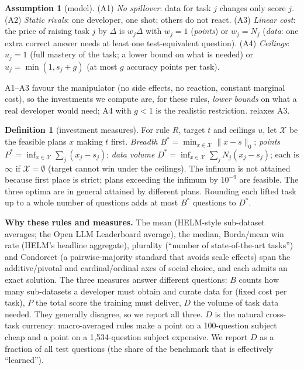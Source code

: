 \documentclass{article}
\theoremstyle{plain}
\theoremstyle{definition}
\newtheorem{definition}{Definition}
\newtheorem{assumption}{Assumption}
\theoremstyle{remark}
\newcommand{\Bst}{B^{\ast}}
\newcommand{\Pst}{P^{\ast}}
\newcommand{\Dst}{D^{\ast}}
\begin{document}
\begin{assumption}[model]\label{ass}
(A1) \emph{No spillover}: data for task $j$ changes only score $j$. (A2) \emph{Static rivals}: one developer, one shot; others do not react. (A3) \emph{Linear cost}: the price of raising task $j$ by $\Delta$ is $w_j\Delta$ with $w_j{=}1$ (\emph{points}) or $w_j{=}N_j$ (\emph{data}: one extra correct answer needs at least one test-equivalent question). (A4) \emph{Ceilings}: $u_j{=}1$ (full mastery of the task; a lower bound on what is needed) or $u_j=\min(1,s_j+g)$ (at most $g$ accuracy points per task).
\end{assumption}
A1--A3 favour the manipulator (no side effects, no reaction, constant marginal cost), so the investments we compute are, for these rules, \emph{lower bounds} on what a real developer would need; A4 with $g<1$ is the realistic restriction.  relaxes A3.

\begin{definition}[investment measures]
For rule $R$, target $t$ and ceilings $u$, let $\mathcal X$ be the feasible plans $x$ making $t$ first.
\emph{Breadth} $\Bst=\min_{x\in\mathcal X}\|x-s\|_0$; \emph{points} $\Pst=\inf_{x\in\mathcal X}\sum_j(x_j-s_j)$; \emph{data volume} $\Dst=\inf_{x\in\mathcal X}\sum_jN_j(x_j-s_j)$; each is $\infty$ if $\mathcal X=\emptyset$ (target cannot win under the ceilings).
The infimum is not attained because first place is strict; plans exceeding the infimum by $10^{-9}$ are feasible. The three optima are in general attained by different plans. Rounding each lifted task up to a whole number of questions adds at most $\Bst$ questions to $\Dst$.
\end{definition}
\textbf{Why these rules and measures.} The mean (HELM-style sub-dataset averages; the Open LLM Leaderboard average), the median, Borda/mean win rate (HELM's headline aggregate), plurality (``number of state-of-the-art tasks'') and Condorcet (a pairwise-majority standard that avoids scale effects) span the additive/pivotal and cardinal/ordinal axes of social choice, and each admits an exact solution. The three measures answer different questions: $B$ counts how many sub-datasets a developer must obtain and curate data for (fixed cost per task), $P$ the total score the training must deliver, $D$ the volume of task data needed. They generally disagree, so we report all three.
$D$ is the natural cross-task currency: macro-averaged rules make a point on a 100-question subject cheap and a point on a 1,534-question subject expensive. We report $D$ as a fraction of all test questions (the share of the benchmark that is effectively ``learned'').
\end{document}
